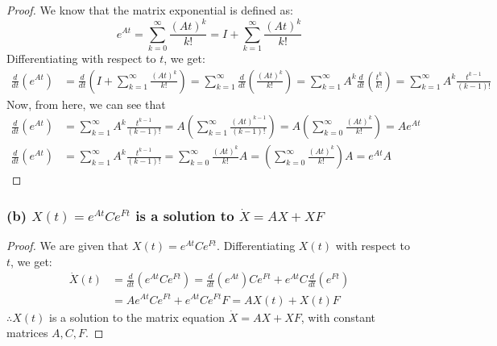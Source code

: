 \begin{proof}
      We know that the matrix exponential is defined as:
      \begin{equation*}
            e^{A t}
            =
            \sum_{k=0}^{\infty} \frac{{(A t)}^{k}}{k !}
            =
            I + \sum_{k=1}^{\infty} \frac{{(A t)}^{k}}{k !}
      \end{equation*}
      Differentiating with respect to \( t \), we get:
      \begin{align*}
            \frac{d}{d t}\left(e^{A t}\right)
             & =
            \frac{d}{d t}\left(I + \sum_{k=1}^{\infty} \frac{{(A t)}^{k}}{k !}\right)
            =
            \sum_{k=1}^{\infty} \frac{d}{d t}\left(\frac{{(A t)}^{k}}{k !}\right)
            =
            \sum_{k=1}^{\infty} A^k \frac{d}{d t}\left(\frac{t^k}{k !}\right)
            =
            \sum_{k=1}^{\infty} A^k \frac{t^{k-1}}{(k-1) !}
      \end{align*}
      Now, from here, we can see that
      \begin{align*}
            \frac{d}{d t}\left(e^{A t}\right)
             & =
            \sum_{k=1}^{\infty} A^k \frac{t^{k-1}}{(k-1) !}
            =
            A \left( \sum_{k=1}^{\infty} \frac{{(A t)}^{k-1}}{(k-1) !} \right)
            =
            A \left( \sum_{k=0}^{\infty} \frac{{(A t)}^{k}}{k !} \right)
            = A e^{A t}
            \\
            \frac{d}{d t}\left(e^{A t}\right)
             & =
            \sum_{k=1}^{\infty} A^k \frac{t^{k-1}}{(k-1) !}
            =
            \sum_{k=0}^{\infty} \frac{{(A t)}^{k}}{k !} A
            =
            \left( \sum_{k=0}^{\infty} \frac{{(A t)}^{k}}{k !} \right) A
            = e^{A t} A
      \end{align*}
\end{proof}

\subsubsection*{(b) \( X(t)=e^{A t} C e^{F t} \) is a solution to \( \dot{X}=A X+X F \)}

\begin{proof}
      We are given that \( X(t)=e^{A t} C e^{F t} \).
      Differentiating \( X(t) \) with respect to \( t \), we get:
      \begin{align*}
            \dot{X}(t)
             & =
            \frac{d}{d t}\left(e^{A t} C e^{F t}\right)
            =
            \frac{d}{d t}\left(e^{A t}\right) C e^{F t} + e^{A t} C \frac{d}{d t}\left(e^{F t}\right)
            \\ & =
            A e^{A t} C e^{F t} + e^{A t} C e^{F t} F
            =
            A X(t) + X(t) F
      \end{align*}
      \( \therefore X(t) \) is a solution to the matrix equation \( \dot{X}=A X+X F \), with constant matrices \( A, C, F \).
\end{proof}
